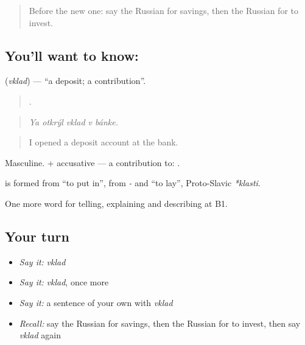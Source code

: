 \label{lesson:RU-C395-vklad}



\begin{quote}
Before the new one: say the Russian for savings, then the Russian for to invest.
\end{quote}

\subsection*{You'll want to know: }
\textbf{} (\emph{vklad}) — \textquotedblleft{}a deposit; a contribution\textquotedblright{}.

\begin{quote}
    .
\end{quote}

\begin{quote}
\emph{Ya otkrýl vklad v bánke.}
\end{quote}

\begin{quote}
I opened a deposit account at the bank.
\end{quote}

Masculine. \emph{ } + accusative — a contribution to: \emph{   }.

\begin{cousinweb}
\textbf{} is formed from \emph{} \textquotedblleft{}to put in\textquotedblright{}, from \emph{-} and \emph{} \textquotedblleft{}to lay\textquotedblright{}, Proto-Slavic \emph{*klasti}.
\end{cousinweb}

\begin{grammarlens}[title={What you've built}]
One more word for telling, explaining and describing at B1.
\end{grammarlens}

\subsection*{Your turn}
\begin{itemize}
\raggedright
  \item \emph{Say it:} \emph{vklad}
  \item \emph{Say it:} \emph{vklad}, once more
  \item \emph{Say it:} a sentence of your own with \emph{vklad}
  \item \emph{Recall:} say the Russian for savings, then the Russian for to invest, then say \emph{vklad} again
\end{itemize}

